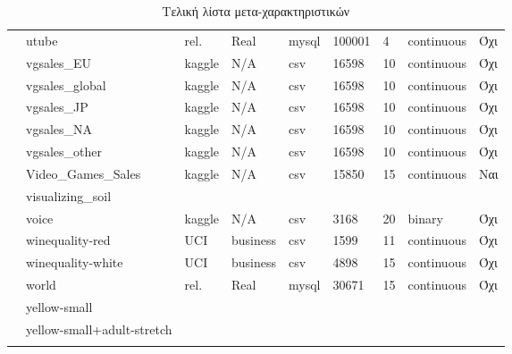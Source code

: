 {\begin{longtable}{|l| l| l | l | l | l |l | l | l | }
 			\rownumber & utube \citep{utube} & rel. & Real & mysql & 100001 & 4 & continuous & Όχι \\
 			\rownumber & vgsales\_EU \citep{vgsales} & kaggle & N/A & csv  & 16598 & 10 & continuous & Όχι\\
 			\rownumber & vgsales\_global \citep{vgsales} & kaggle & N/A & csv  & 16598 & 10 & continuous & Όχι \\
 			\rownumber & vgsales\_JP \citep{vgsales} & kaggle & N/A & csv  & 16598 & 10 & continuous & Όχι \\
 			\rownumber & vgsales\_NA \citep{vgsales} & kaggle & N/A & csv  & 16598 & 10 & continuous & Όχι \\
 			\rownumber & vgsales\_other \citep{vgsales} & kaggle & N/A & csv  & 16598 & 10 & continuous & Όχι \\
 			\rownumber & Video\_Games\_Sales \citep{vgames} & kaggle & N/A & csv & 15850 & 15 & continuous & Ναι \\
 			\rownumber & visualizing\_soil & & & & & & & \\
 			\rownumber & voice \citep{Gender Recognition by Voice} & kaggle & N/A & csv & 3168 & 20 & binary & Όχι \\
 			\rownumber & winequality-red & UCI & business & csv & 1599 & 11 & continuous & Όχι \\
 			\rownumber & winequality-white & UCI & business & csv & 4898 & 15 & continuous & Όχι \\
 			\rownumber & world & rel. & Real & mysql & 30671 & 15 & continuous & Όχι \\
 		 \rownumber & yellow-small & & & & & & & \\
 			\rownumber & yellow-small+adult-stretch & & & & & & & \\
			\hline   
			\caption{Τελική λίστα μετα-χαρακτηριστικών}\label{mfs} 
 \end{longtable}
}